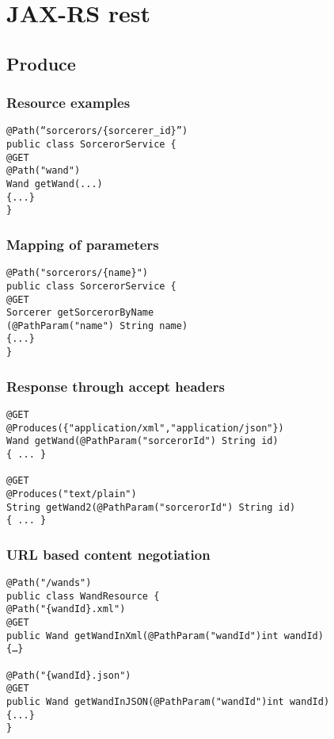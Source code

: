\chapter{JAX-RS rest}
\label{JAX-RS rest}
\thispagestyle{chapternohead}

	
\pagestyle{ruledfilip}


\section{Produce}

\subsection{Resource examples}

\begin{verbatim}
@Path(“sorcerors/{sorcerer_id}”)
public class SorcerorService {
@GET
@Path("wand")
Wand getWand(...)
{...}
}
\end{verbatim}

\subsection{Mapping of parameters}

\begin{verbatim}
@Path("sorcerors/{name}")
public class SorcerorService {
@GET
Sorcerer getSorcerorByName
(@PathParam("name") String name)
{...}
}
\end{verbatim}

\subsection{Response through accept headers}

\begin{verbatim}
@GET
@Produces({"application/xml","application/json"})
Wand getWand(@PathParam("sorcerorId") String id)
{ ... }

@GET
@Produces("text/plain")
String getWand2(@PathParam("sorcerorId") String id)
{ ... }
\end{verbatim}

\subsection{URL based content negotiation}

\begin{verbatim}
@Path("/wands")
public class WandResource {
@Path("{wandId}.xml")
@GET
public Wand getWandInXml(@PathParam("wandId")int wandId)
{…}

@Path("{wandId}.json")
@GET
public Wand getWandInJSON(@PathParam("wandId")int wandId)
{...}
}
\end{verbatim}

